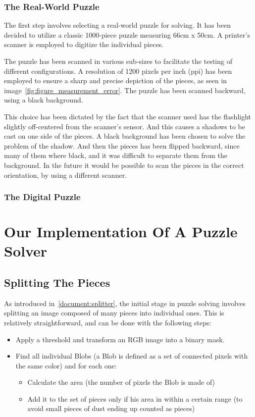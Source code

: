 \documentclass{article}
\begin{document}
\subsubsection{The Real-World Puzzle}
The first step involves selecting a real-world
puzzle for solving. It has been decided to utilize a
classic 1000-piece puzzle measuring 66cm x 50cm.
A printer's scanner is employed to digitize the individual pieces.

The puzzle has been scanned in various sub-sizes to facilitate the testing of different configurations.
A resolution of 1200 pixels per inch (ppi) has been employed to ensure a sharp and precise
depiction of the pieces, as seen in image~\cref{fig:figure_measurement_error}.
The puzzle has been scanned backward, using a black background.

This choice has been dictated by the fact that the scanner used has the flashlight
slightly off-centered from the scanner's sensor.
And this causes a shadows to be cast on one side of the pieces.
A black background has been chosen to solve the problem of the shadow.
And then the pieces has been flipped backward, since many of them where black,
and it was difficult to separate them from the background.
In the future it would be possible to scan the pieces in the correct orientation,
by using a different scanner.

\subsubsection{The Digital Puzzle}

\section{Our Implementation Of A Puzzle Solver}

\subsection{Splitting The Pieces}

As introduced in~\cref{document:splitter},  the initial stage in puzzle solving involves
splitting an image composed of many pieces into individual ones.
This is relatively straightforward, and can be done with the following steps:

\begin{itemize}
  \item Apply a threshold and transform an RGB image into a binary mask.
  \item Find all individual Blobs
  (a Blob is defined as a set of connected pixels with the same color) and for each one:

  \begin{itemize}
  \item Calculate the area (the number of pixels the Blob is made of)

  \item Add it to the set of pieces only if his area in within a certain range (to avoid small pieces of dust ending up counted as pieces)

  \end{itemize}

\end{itemize}
\end{document}
